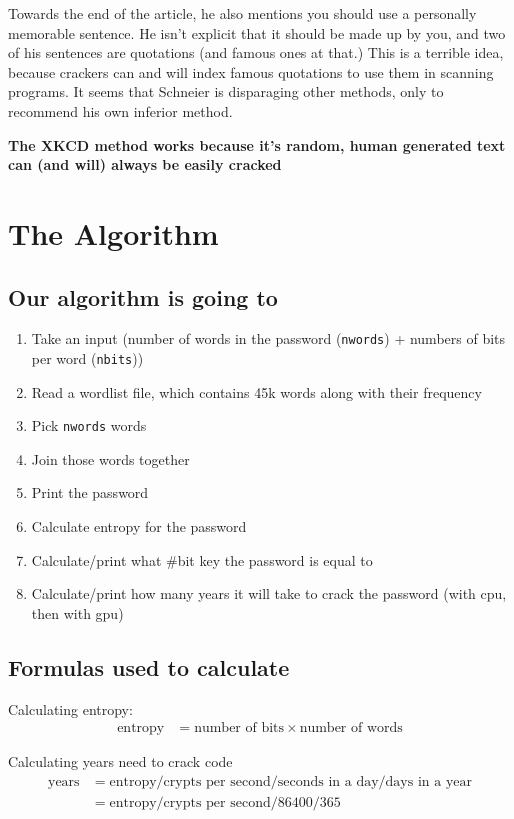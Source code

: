 \documentclass{scrartcl}
\begin{document}
Towards the end of the article, he also mentions you should use a personally
memorable sentence. He isn’t explicit that it should be made up by you, and two
of his sentences are quotations (and famous ones at that.) This is a terrible
idea, because crackers can and will index famous quotations to use them in
scanning programs. It seems that Schneier is disparaging other methods, only to
recommend his own inferior method.

\textbf{The XKCD method works because it's random, human generated text can (and will) always be easily cracked}

\section{The Algorithm}
\label{sec:org0745465}
\subsection{Our algorithm is going to}
\label{sec:org68f5f72}
\begin{enumerate}
\item Take an input (number of words in the password (\texttt{nwords}) + numbers of bits per
word (\texttt{nbits}))
\item Read a wordlist file, which contains 45k words along with their frequency
\item Pick \texttt{nwords} words
\item Join those words together
\item Print the password
\item Calculate entropy for the password
\item Calculate/print what \#bit key the password is equal to
\item Calculate/print how many years it will take to crack the password (with cpu,
then with gpu)
\end{enumerate}

\subsection{Formulas used to calculate}
\label{sec:org910e0a0}
Calculating entropy:
\begin{align*}
\text{entropy}&=\text{number of bits}\times\text{number of words}
\end{align*}

Calculating years need to crack code
\begin{align*}
\text{years}&=\text{entropy}/\text{crypts per second}/\text{seconds in a day}/\text{days in a year}\\
&=\text{entropy}/\text{crypts per second}/86400/365
\end{align*}
\end{document}

